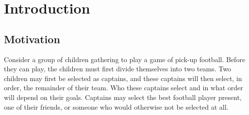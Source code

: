 \chapter{\label{ch:intro}Introduction} 


\minitoc

\section{Motivation}


Consider a group of children gathering to play a game of pick-up football. Before they can play, the children must first divide themselves into two teams. Two children may first be selected as captains, and these captains will then select, in order, the remainder of their team. Who these captains select and in what order will depend on their goals. Captains may select the best football player present, one of their friends, or someone who would otherwise not be selected at all.

